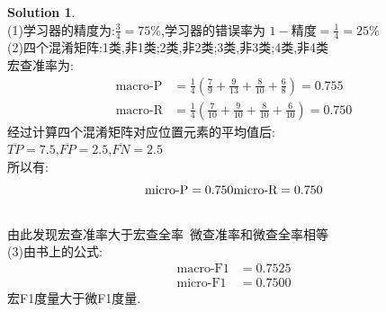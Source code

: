 \documentclass[a4paper,UTF8]{article}
\numberwithin{equation}{section}
\theoremstyle{definition}
\newtheorem*{solution}{Solution}
\begin{document}
	\begin{solution}
		~\\(1)学习器的精度为:$\frac{3}{4}=75\%$,\quad 学习器的错误率为 $1-\text{精度}=\frac{1}{4}=25\%$
		~\\(2)四个混淆矩阵:1类,非1类;2类,非2类;3类,非3类;4类,非4类\\
		宏查准率为:
		\[
			\begin{split}
			\text{macro-P}&=\frac{1}{4}(\frac{7}{9}+\frac{9}{13}+\frac{8}{10}+\frac{6}{8})=0.755\\
			\text{macro-R}&=\frac{1}{4}(\frac{7}{10}+\frac{9}{10}+\frac{8}{10}+\frac{6}{10})=0.750
			\end{split}
		\]
		经过计算四个混淆矩阵对应位置元素的平均值后:\\
		$\overline{TP}=7.5$,$\overline{FP}=2.5$,$\overline{FN}=2.5$\\所以有:
		\[
			\text{micro-P}=0.750\\
			\text{micro-R}=0.750
		\]
		~\\由此发现宏查准率大于宏查全率\  微查准率和微查全率相等
		~\\(3)由书上的公式:
		\[
			\begin{split}
			\text{macro-F1}&=0.7525\\
			\text{micro-F1}&=0.7500
			\end{split}
		\]
		宏F1度量大于微F1度量.
	\end{solution}

\newpage
\end{document}
